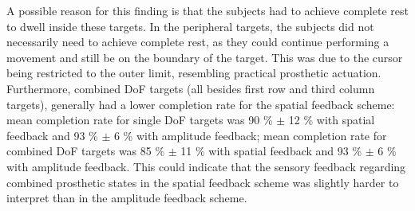 A possible reason for this finding is that the subjects had to achieve complete rest to dwell inside these targets. In the peripheral targets, the subjects did not necessarily need to achieve complete rest, as they could continue performing a movement and still be on the boundary of the target. This was due to the cursor being restricted to the outer limit, resembling practical prosthetic actuation.  
Furthermore, combined DoF targets (all besides first row and third column targets), generally had a lower completion rate for the spatial feedback scheme: mean completion rate for single DoF targets was 90 \% $\pm$ 12 \% with spatial feedback and 93 \% $\pm$ 6 \% with amplitude feedback; mean completion rate for combined DoF targets was 85 \% $\pm$ 11 \% with spatial feedback and 93 \% $\pm$ 6 \% with amplitude feedback. This could indicate that the sensory feedback regarding combined prosthetic states in the spatial feedback scheme was slightly harder to interpret than in the amplitude feedback scheme. 







